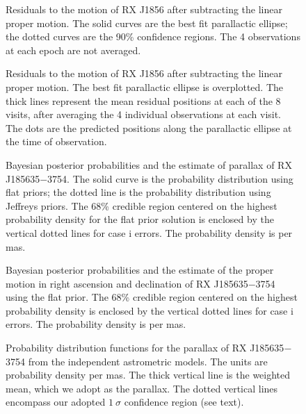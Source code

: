 \documentclass[12pt,preprint]{aastex}
\begin{document}
\begin{figure}
\caption{Residuals to the motion of RX J1856 after subtracting the 
linear proper motion. The solid curves are the best fit parallactic ellipse;
the dotted curves are the 90\% confidence regions. The 4 observations at each
epoch are not averaged.
\label{fig-plx1}}
\end{figure}

\begin{figure}
\caption{Residuals to the motion of RX J1856 after subtracting the 
linear proper motion. The best fit parallactic ellipse is overplotted. 
The
thick lines represent the
mean residual positions at each of the 8 visits, after averaging the 
4 individual observations at each visit.
The dots are the predicted positions
along the parallactic ellipse at the time of observation.
\label{fig-plx3}}
\end{figure}

\clearpage
\begin{figure}
\caption{Bayesian posterior probabilities and the estimate of parallax
of RX J185635$-$3754. The solid curve is the probability distribution
using flat priors; the dotted line is the probability distribution using
Jeffreys priors. 
The 68\% credible region centered on the highest probability
density for the flat prior solution is enclosed by the vertical
dotted lines for case i errors.
The probability density is per mas.
\label{fig-bpar}}
\end{figure}

\clearpage
\begin{figure}
\caption{Bayesian posterior probabilities and the estimate of the proper motion
in right ascension and declination
of RX J185635$-$3754 using the flat prior.
The 68\% credible region centered on the highest probability
density is enclosed by the vertical dotted lines for case i errors.
The probability density is per mas.
\label{fig-bmu}}
\end{figure}

\clearpage
\begin{figure}
\caption{Probability distribution functions for the parallax
of RX J185635$-$3754 from
the independent astrometric models.
The units are probability density per mas.
The thick vertical line is the weighted mean, 
which we adopt as the parallax. The dotted vertical lines encompass our
adopted $1~\sigma$ confidence region (see text).
\label{fig-plxpdf}}
\end{figure}
\end{document}
